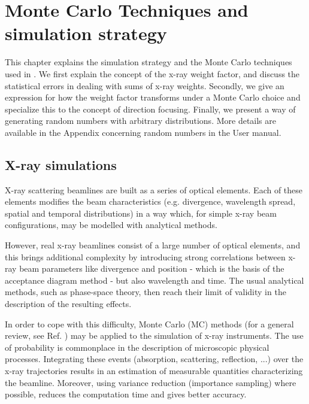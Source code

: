 \chapter{Monte Carlo Techniques and simulation strategy}
\label{s:MCtechniques}

This chapter explains the simulation strategy and the Monte Carlo
techniques used in \MCX. We first explain the concept of the x-ray
weight factor, and discuss the statistical errors in dealing with sums
of x-ray weights.  Secondly, we give an expression for how the weight
factor transforms under a Monte Carlo choice and specialize this
to the concept of direction focusing.  Finally, we present a way of
generating random numbers with arbitrary distributions.
More details are available in the Appendix concerning random numbers in the User manual.


\section{X-ray simulations}
X-ray scattering beamlines are built as a series of optical elements.
Each of these elements modifies the beam characteristics (e.g. divergence,
wavelength spread, spatial and temporal distributions) in a way which, for simple
x-ray beam configurations, may be modelled with analytical methods. 


However, real x-ray beamlines consist of a large number of optical
elements, and this brings additional complexity by introducing strong
correlations between x-ray beam parameters like divergence and position - which
is the basis of the acceptance diagram method - but also wavelength and time.
The usual analytical methods, such as phase-space theory, then reach their
limit of validity in the description of the resulting effects.

In order to cope with this difficulty, Monte Carlo (MC) methods (for a general review, see Ref. \cite{James80}) may be
applied to the simulation of x-ray instruments. The use of probability is commonplace in the description of microscopic
physical processes. Integrating these events (absorption, scattering, reflection, ...) over the x-ray trajectories
results in an estimation of measurable quantities characterizing the beamline. Moreover, using variance reduction
(importance sampling) where possible, reduces the computation time and gives better accuracy.

